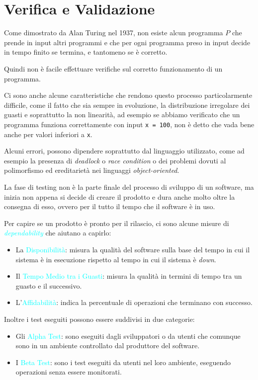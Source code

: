 \section{Verifica e Validazione}

Come dimostrato da Alan Turing nel 1937, non esiste
alcun programma $P$ che prende in input altri programmi e che
per ogni programma preso in input decide in tempo finito se termina,
e tantomeno se è corretto.

Quindi non è facile effettuare verifiche sul corretto funzionamento di un programma.

Ci sono anche alcune caratteristiche che rendono questo processo particolarmente
difficile, come il fatto che sia sempre in evoluzione, la distribuzione
irregolare dei guasti e soprattutto la non linearità, ad esempio se
abbiamo verificato che un programma funziona correttamente con input
\verb|x = 100|, non è detto che vada bene anche per valori inferiori a \verb|x|.

Alcuni errori, possono dipendere soprattutto dal linguaggio utilizzato,
come ad esempio la presenza di \emph{deadlock} o \emph{race condition} o
dei problemi dovuti al polimorfismo ed ereditarietà nei linguaggi \emph{object-oriented}.

La fase di testing non è la parte finale del processo di sviluppo di un software,
ma inizia non appena si decide di creare il prodotto e dura anche molto oltre la consegna
di esso, ovvero per il tutto il tempo che il software è in uso.

Per capire se un prodotto è pronto per il rilascio, ci sono alcune misure di \emph{\textcolor{cyan}{dependability}}
che aiutano a capirlo:
\begin{itemize}
    \item La \textcolor{cyan}{Disponibilità}: misura la qualità del software
        sulla base del tempo in cui il sistema è in esecuzione rispetto al tempo
        in cui il sistema è \emph{down}.
    \item Il \textcolor{cyan}{Tempo Medio tra i Guasti}: misura la qualità in termini di
        tempo tra un guasto e il successivo.
    \item L'\textcolor{cyan}{Affidabilità}: indica la percentuale di operazioni che terminano
        con successo.
\end{itemize}

Inoltre i test eseguiti possono essere suddivisi in due categorie:
\begin{itemize}
    \item Gli \textcolor{cyan}{Alpha Test}: sono eseguiti dagli sviluppatori
        o da utenti che comunque sono in un ambiente controllato dal produttore
        del software.
    \item I \textcolor{cyan}{Beta Test}: sono i test eseguiti da utenti nel loro
        ambiente, eseguendo operazioni senza essere monitorati.
\end{itemize}

